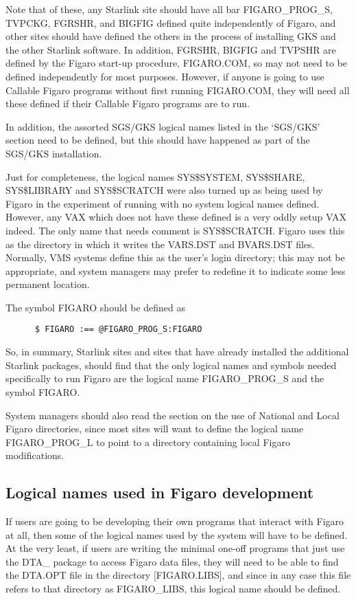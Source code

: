 Note that of these, any Starlink site should have all bar FIGARO\_PROG\_S,
TVPCKG, FGRSHR, and BIGFIG defined quite independently of Figaro, and other
sites should have defined the others in  the process of installing GKS and the
other Starlink software. In addition, FGRSHR, BIGFIG and TVPSHR are defined by
the Figaro start-up procedure, FIGARO.COM, so may not need to be defined
independently for most purposes. However, if anyone is going to use Callable
Figaro programs without first running FIGARO.COM, they will need all these
defined if their Callable Figaro programs are to run.

In addition, the assorted SGS/GKS logical names listed in the `SGS/GKS' section
need to be defined, but this should have happened as part of the SGS/GKS
installation.

Just for completeness, the logical names SYS\$SYSTEM, SYS\$SHARE, SYS\$LIBRARY
and SYS\$SCRATCH were also turned up as being used by Figaro in the experiment
of running with no system logical names defined. However, any  VAX which does
not have these defined is a very oddly setup VAX indeed. The only name that
needs comment is SYS\$SCRATCH. Figaro uses this as the directory in which it
writes the VARS.DST and BVARS.DST files. Normally, VMS systems define this as
the user's login directory; this may not be appropriate, and system managers
may prefer to redefine it to indicate some  less permanent location.

The symbol FIGARO should be defined as

\begin{verbatim}
      $ FIGARO :== @FIGARO_PROG_S:FIGARO
\end{verbatim}

So, in summary, Starlink sites and sites that have already installed the
additional Starlink packages, should find that the only logical names and
symbols needed specifically to run Figaro are the logical name FIGARO\_PROG\_S
and the symbol FIGARO.

System managers should also read the section on the use of National and Local
Figaro directories, since most sites will want to define the logical  name
FIGARO\_PROG\_L to point to a directory containing local Figaro modifications.

\subsection{Logical names used in Figaro development}

If users are going to be developing their own programs that interact with
Figaro at all, then some of the logical names used by the system will have to
be defined. At the very least, if users are writing the minimal one-off
programs that just use the DTA\_ package to access Figaro data files, they will
need to be able to find the DTA.OPT file in the directory [FIGARO.LIBS], and
since in any case this file refers to that directory as FIGARO\_LIBS, this
logical name should be defined.

